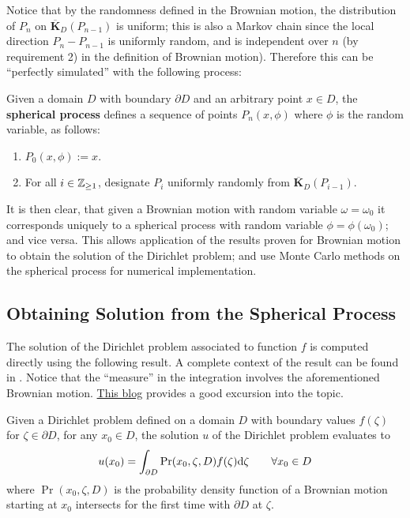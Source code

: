 \documentclass[10pt]{article}
\begin{document}
\textstart
Notice that by the randomness defined in the Brownian motion, the distribution of $P_n$ on $\overline{\bm{K}}_D(P_{n-1})$ is uniform; this is also a Markov chain since the local direction $P_n - P_{n-1}$ is uniformly random, and is independent over $n$ (by requirement 2) in the definition of Brownian motion). Therefore this can be ``perfectly simulated'' with the following process:

\begin{definition}
    Given a domain $D$ with boundary $\partial D$ and an arbitrary point $x \in D$, the \textbf{spherical process} defines a sequence of points $P_n(x, \phi)$ where $\phi$ is the random variable, as follows:
    \begin{enumerate}
        \item $P_0(x, \phi) := x$.
        \item For all $i \in \mathbb{Z}_{\geq 1}$, designate $P_i$ uniformly randomly from $\overline{\bm{K}}_D (P_{i-1})$. 
    \end{enumerate}
\end{definition}

It is then clear, that given a Brownian motion with random variable $\omega = \omega_0$ it corresponds uniquely to a spherical process with random variable $\phi = \phi(\omega_0)$; and vice versa. This allows application of the results proven for Brownian motion to obtain the solution of the Dirichlet problem; and use Monte Carlo methods on the spherical process for numerical implementation.

\subsection{Obtaining Solution from the Spherical Process}

\textstart
The solution of the Dirichlet problem associated to function $f$ is computed directly using the following result. A complete context of the result can be found in \cite{Kakutani1944}. Notice that the ``measure'' in the integration involves the aforementioned Brownian motion. \href{https://willierushrush.github.io/posts/2021/08/dirichlet-problem}{This blog} provides a good excursion into the topic. 

\begin{proposition}
    Given a Dirichlet problem defined on a domain $D$ with boundary values $f(\zeta)$ for $\zeta \in \partial D$, for any $x_0 \in D$, the solution $u$ of the Dirichlet problem evaluates to
    \[
        u(x_0) = \int_{\partial D} \mathrm{Pr}(x_0, \zeta, D) f(\zeta) \mathrm{d} \zeta \qquad \forall x_0 \in D
    \]
    where $\Pr(x_0, \zeta, D)$ is the probability density function of a Brownian motion starting at $x_0$ intersects for the first time with $\partial D$ at $\zeta$.
\end{proposition}
\end{document}
